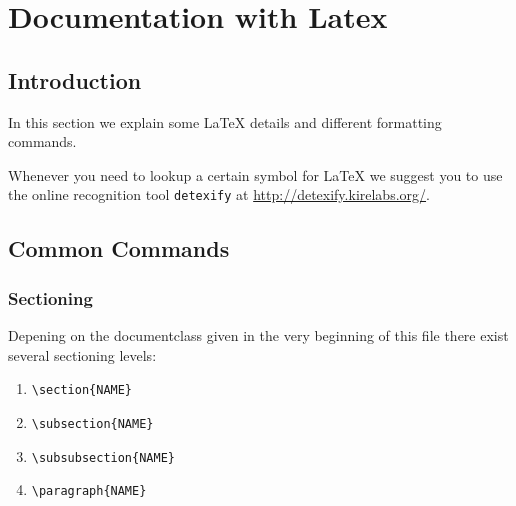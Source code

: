 \documentclass[10pt,a4paper]{scrartcl}
\begin{document}
\section{Documentation with Latex}
\subsection{Introduction} 

In this section we explain some \LaTeX\xspace details and different formatting
commands.

Whenever you need to lookup a certain symbol for \LaTeX\xspace we suggest you
to use the online recognition tool \texttt{detexify} at
\url{http://detexify.kirelabs.org/}.


\subsection{Common Commands}
\subsubsection{Sectioning}
Depening on the documentclass given in the very beginning of this file there
exist several sectioning levels:
\begin{enumerate}
\item{} \verb$\section{NAME}$
\item{} \verb$\subsection{NAME}$
\item{} \verb$\subsubsection{NAME}$
\item{} \verb$\paragraph{NAME}$
\end{enumerate}
\end{document}
